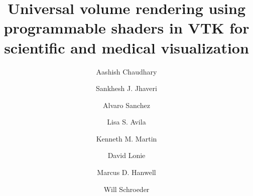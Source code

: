 \title{Universal volume rendering using programmable shaders in VTK for
scientific and medical visualization}

\author{Aashish Chaudhary}

\author{Sankhesh J. Jhaveri}

\author{Alvaro Sanchez\corref{}}

\author{Lisa S. Avila}

\author{Kenneth M. Martin}

\author{David Lonie}

\author{Marcus D. Hanwell}

\author{Will Schroeder}

\address{Kitware, Inc., 28 Corporate Drive, Clifton Park, NY 12065, USA}
